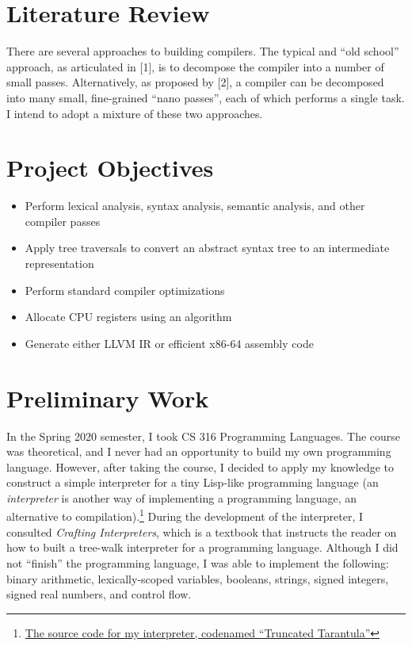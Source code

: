 \documentclass[12pt]{report}
\begin{document}
\section*{{\large Literature Review}}
There are several approaches to building compilers.  The typical and ``old school'' approach, as articulated in [1], is to decompose the compiler into a number of small passes. Alternatively, as proposed by [2], a compiler can be decomposed into many small, fine-grained ``nano passes'', each of which performs a single task.  I intend to adopt a mixture of these two approaches.

\section*{{\large Project Objectives}}
\begin{itemize}
 	\item Perform lexical analysis, syntax analysis, semantic analysis, and other compiler passes
 	\item Apply tree traversals to convert an abstract syntax tree to an intermediate representation
	\item Perform standard compiler optimizations
	\item Allocate CPU registers using an algorithm
	\item Generate either LLVM IR or efficient x86-64 assembly code
\end{itemize}

\section*{{\large Preliminary Work}}
In the Spring 2020 semester, I took CS 316 Programming Languages.  The course was theoretical, and I never had an opportunity to build my own programming language.  However, after taking the course, I decided to apply my knowledge to construct a simple interpreter for a tiny Lisp-like programming language (an \textit{interpreter} is another way of implementing a programming language, an alternative to compilation).\footnote{\href{https://github.com/MatthewKosloski/truncated-tarantula}{The source code for my interpreter, codenamed ``Truncated Tarantula''}}  During the development of the interpreter, I consulted \textit{Crafting Interpreters}, which is a textbook that instructs the reader on how to built a tree-walk interpreter for a programming language.  Although I did not ``finish'' the programming language, I was able to implement the following: binary arithmetic, lexically-scoped variables, booleans, strings, signed integers, signed real numbers, and control flow.
\end{document}

